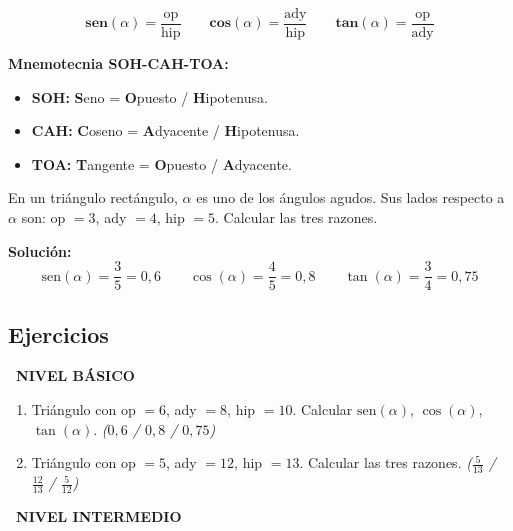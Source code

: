 \documentclass[11pt,a4paper]{article}
\newcommand{\nivelbasico}{%
  \par\smallskip\colorbox{green!60!black}{\color{white}\small\bfseries\ NIVEL BÁSICO\ }\par\smallskip}
\newcommand{\nivelintermedio}{%
  \par\smallskip\colorbox{naranja}{\color{white}\small\bfseries\ NIVEL INTERMEDIO\ }\par\smallskip}
\begin{document}
\begin{tcolorbox}[formula]
\[
  \mathbf{sen}(\alpha) = \dfrac{\text{op}}{\text{hip}}
  \qquad
  \mathbf{cos}(\alpha) = \dfrac{\text{ady}}{\text{hip}}
  \qquad
  \mathbf{tan}(\alpha) = \dfrac{\text{op}}{\text{ady}}
\]
\end{tcolorbox}

\begin{tcolorbox}[recuerda]
\textbf{Mnemotecnia SOH-CAH-TOA:}
\begin{itemize}[nosep]
  \item \textbf{SOH:} \textbf{S}eno = \textbf{O}puesto / \textbf{H}ipotenusa.
  \item \textbf{CAH:} \textbf{C}oseno = \textbf{A}dyacente / \textbf{H}ipotenusa.
  \item \textbf{TOA:} \textbf{T}angente = \textbf{O}puesto / \textbf{A}dyacente.
\end{itemize}
\end{tcolorbox}

\begin{tcolorbox}[ejemplo, title=Ejemplo 1]
En un triángulo rectángulo, $\alpha$ es uno de los ángulos agudos. Sus lados respecto a $\alpha$ son: op $= 3$, ady $= 4$, hip $= 5$. Calcular las tres razones.

\medskip

\textbf{Solución:}
\[
  \mathrm{sen}(\alpha) = \frac{3}{5} = 0{,}6
  \qquad
  \cos(\alpha) = \frac{4}{5} = 0{,}8
  \qquad
  \tan(\alpha) = \frac{3}{4} = 0{,}75
\]
\end{tcolorbox}

\subsection*{Ejercicios}

\nivelbasico

\begin{enumerate}[label=\textbf{\arabic*.},leftmargin=1cm,itemsep=8pt]
  \item Triángulo con op $= 6$, ady $= 8$, hip $= 10$.
  Calcular $\mathrm{sen}(\alpha)$, $\cos(\alpha)$, $\tan(\alpha)$. \hfill \textit{($0{,}6$ / $0{,}8$ / $0{,}75$)}

  \item Triángulo con op $= 5$, ady $= 12$, hip $= 13$.
  Calcular las tres razones. \hfill \textit{($\frac{5}{13}$ / $\frac{12}{13}$ / $\frac{5}{12}$)}
\end{enumerate}

\nivelintermedio
\end{document}
